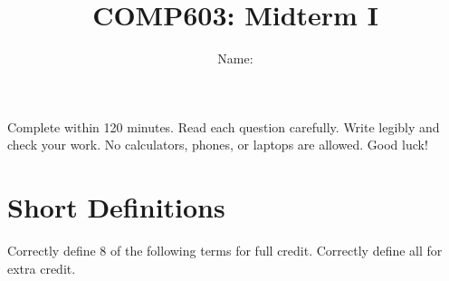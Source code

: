 \documentclass[10pt]{amsart}
\title{COMP603: Midterm I}
\author{Name: \underline{\hspace{3in}}}
\begin{document}
\maketitle


Complete within 120 minutes. Read each question carefully. Write legibly and check your work. No calculators, phones, or laptops are allowed. Good luck!
\section{Short Definitions}
Correctly define 8 of the following terms for full credit. Correctly define all for extra credit.\\
\end{document}
